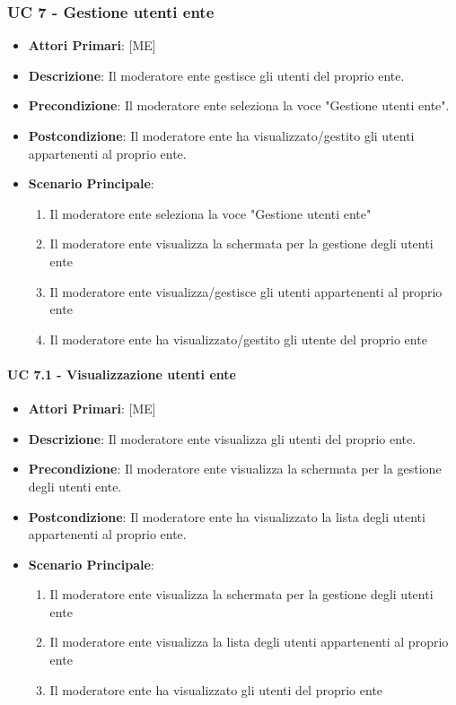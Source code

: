 \subsubsection{UC 7 - Gestione utenti ente}
		
		
		
		\begin{itemize}
			\item \textbf{Attori Primari}: [ME]
			\item \textbf{Descrizione}: Il moderatore ente gestisce gli utenti del proprio ente.
			\item \textbf{Precondizione}: Il moderatore ente seleziona la voce "Gestione utenti ente".
			\item \textbf{Postcondizione}: Il moderatore ente ha visualizzato/gestito gli utenti appartenenti al proprio ente.
			\item \textbf{Scenario Principale}:
			\begin{enumerate}
				\item{Il moderatore ente seleziona la voce "Gestione utenti ente"}
				\item{Il moderatore ente visualizza la schermata per la gestione degli utenti ente}
				\item{Il moderatore ente visualizza/gestisce gli utenti appartenenti al proprio ente}
				\item{Il moderatore ente ha visualizzato/gestito gli utente del proprio ente}
			\end{enumerate}	
		\end{itemize}
			
			\paragraph{UC 7.1 - Visualizzazione utenti ente}
			\begin{itemize}
				\item \textbf{Attori Primari}: [ME]
				\item \textbf{Descrizione}: Il moderatore ente visualizza gli utenti del proprio ente.
				\item \textbf{Precondizione}: Il moderatore ente visualizza la schermata per la gestione degli utenti ente.
				\item \textbf{Postcondizione}: Il moderatore ente ha visualizzato la lista degli utenti appartenenti al proprio ente.
				\item \textbf{Scenario Principale}:
				\begin{enumerate}
					\item{Il moderatore ente visualizza la schermata per la gestione degli utenti ente}
					\item{Il moderatore ente visualizza la lista degli utenti appartenenti al proprio ente}
					\item{Il moderatore ente ha visualizzato gli utenti del proprio ente}
				\end{enumerate}	
			\end{itemize}
			
